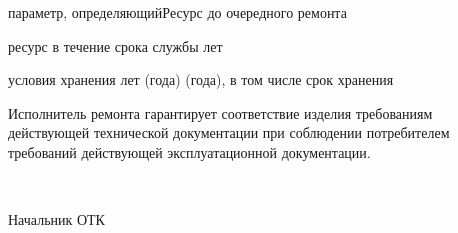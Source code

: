 \noindent
\blankfieldtxt[с]{\textwidth}{}
  {параметр, определяющий}{Ресурс до очередного ремонта}{}

\noindent
{}
  {ресурс}
  {}
  {в течение срока службы}
\hfill
{}
{}{}{лет}

\noindent
\blankfieldtxt[с]{\textwidth}{}
  {условия хранения лет (года)}
  {(года), в том числе срок хранения}
  {}

\bigskip{}\bigskip
Исполнитель ремонта гарантирует соответствие 
изделия требованиям действующей технической 
документации при соблюдении потребителем требований 
действующей эксплуатационной документации.

\begin{centering} 
  \ \par\bigskip Начальник ОТК \par
\end{centering}
\bigskip
\MPscript
